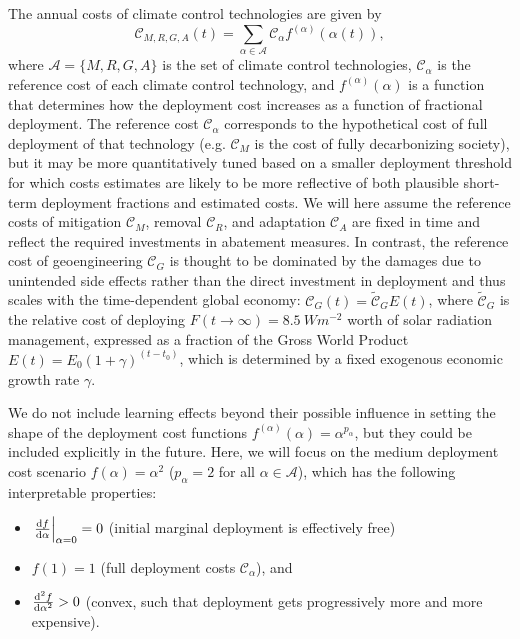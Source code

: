 \documentclass{article}
\begin{document}
The annual costs of climate control technologies are given by
\begin{equation}
    \mathcal{C}_{M, R, G, A}(t) = \sum_{\alpha \in \mathcal{A}} \mathcal{C}_{\alpha} f^{(\alpha)}(\alpha(t)),
\end{equation}
where $\mathcal{A} = \{M, R, G, A \}$ is the set of climate control technologies, $\mathcal{C}_{\alpha}$ is the reference cost of each climate control technology, and $f^{(\alpha)}(\alpha)$ is a function that determines how the deployment cost increases as a function of fractional deployment. The reference cost $\mathcal{C}_{\alpha}$ corresponds to the hypothetical cost of full deployment of that technology (e.g. $\mathcal{C}_{M}$ is the cost of fully decarbonizing society), but it may be more quantitatively tuned based on a smaller deployment threshold for which costs estimates are likely to be more reflective of both plausible short-term deployment fractions and estimated costs. We will here assume the reference costs of mitigation $\mathcal{C}_{M}$, removal $\mathcal{C}_{R}$, and adaptation $\mathcal{C}_{A}$ are fixed in time and reflect the required investments in abatement measures. In contrast, the reference cost of geoengineering $\mathcal{C}_{G}$ is thought to be dominated by the damages due to unintended side effects rather than the direct investment in deployment and thus scales with the time-dependent global economy: $\mathcal{C}_{G}(t) = \tilde{\mathcal{C}}_{G} E(t)$, where $\tilde{\mathcal{C}}_{G}$ is the relative cost of deploying $F(t \rightarrow \infty) = \SI{8.5}{W m^{-2}}$ worth of solar radiation management, expressed as a fraction of the Gross World Product $E(t) = E_{0}(1 + \gamma)^{(t-t_{0})}$, which is determined by a fixed exogenous economic growth rate $\gamma$.

We do not include learning effects beyond their possible influence in setting the shape of the deployment cost functions $f^{(\alpha)}(\alpha) = \alpha^{p_{\alpha}}$, but they could be included explicitly in the future. Here, we will focus on the medium deployment cost scenario $f(\alpha) = \alpha^{2}$ ($p_{\alpha} = 2$ for all $\alpha \in \mathcal{A}$), which has the following interpretable properties: 
\begin{itemize}
    \item $\left. \dv{f}{\alpha}\right|_{\alpha=0} = 0$ (initial marginal deployment is effectively free)
    \item $f(1) = 1$ (full deployment costs $\mathcal{C}_{\alpha}$), and
    \item $\dv[2]{f}{\alpha} > 0$ (convex, such that deployment gets progressively more and more expensive).
\end{itemize}
\end{document}
